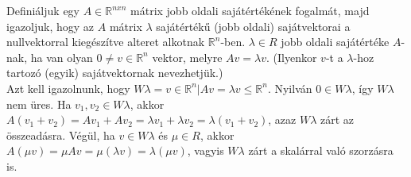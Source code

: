 \begin{frame}
  \begin{tcolorbox}[title={15. (4p)}]
       Definiáljuk egy $A \in \mathbb{R}^{n x n}$ mátrix jobb oldali sajátértékének fogalmát, majd igazoljuk, hogy az $A$ mátrix ${\lambda}$ sajátértékű (jobb oldali) sajátvektorai a nullvektorral kiegészítve alteret alkotnak $\mathbb{R}^n$-ben.
  \tcblower
    ${\lambda} \in R$ jobb oldali sajátértéke $A$-nak, ha van olyan $0 \neq v \in \mathbb{R}^n$ vektor, melyre $Av = {\lambda}v$. (Ilyenkor $v$-t a ${\lambda}$-hoz tartozó (egyik) sajátvektornak nevezhetjük.)\\
    
    Azt kell igazolnunk, hogy $W{\lambda} = {v \in \mathbb{R}^n |Av = {\lambda}v} \leq \mathbb{R}^n$. Nyilván $0 \in W{\lambda}$, így $W{\lambda}$ nem üres. Ha $v_1,v_2 \in W{\lambda}$, akkor $A(v_1 +v_2) = Av_1 +Av_2 = {\lambda}v_1 +{\lambda}v_2 = {\lambda}(v_1 +v_2)$, azaz $W{\lambda}$ zárt az összeadásra. Végül, ha $v \in W{\lambda}$ és ${\mu} \in R$, akkor $A({\mu}v) = {\mu}Av = {\mu}({\lambda}v) = {\lambda}({\mu}v)$, vagyis $W{\lambda}$ zárt a skalárral való szorzásra is.
  \end{tcolorbox}
\end{frame}



